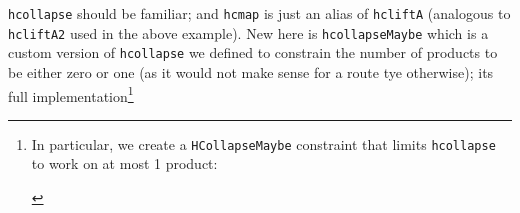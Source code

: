 \texttt{hcollapse} should be familiar; and \texttt{hcmap} is just an
alias of \texttt{hcliftA} (analogous to \texttt{hcliftA2} used in the
above example). New here is \texttt{hcollapseMaybe} which is a custom
version of \texttt{hcollapse} we defined to constrain the number of
products to be either zero or one (as it would not make sense for a
route tye otherwise); its full implementation\footnote{In particular, we
  create a \texttt{HCollapseMaybe} constraint that limits
  \texttt{hcollapse} to work on at most 1 product:

\begin{Shaded}
\begin{Highlighting}[]
 
 \OtherTok{=\textgreater{}}\OtherTok{{-}\textgreater{}} 

  \NormalTok{ \textquotesingle{}[] }
\OtherTok{=} 

  \NormalTok{ \textquotesingle{}[p] }
\OperatorTok{:*} \NormalTok{) }\OtherTok{=} 

\OperatorTok{\textasciitilde{}} \NormalTok{ (} \NormalTok{)) }\OtherTok{=\textgreater{}}  \OperatorTok{:}\OperatorTok{:}
\OtherTok{=}  

\NormalTok{ (}  \OtherTok{=\textgreater{}} 

\NormalTok{ (}  \OtherTok{=\textgreater{}} 
\end{Highlighting}
\end{Shaded}

}
